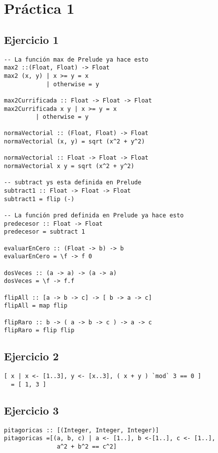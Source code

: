 \section{Práctica 1}
\subsection{Ejercicio 1}
\begin{centrado}
\begin{verbatim}
-- La función max de Prelude ya hace esto
max2 ::(Float, Float) -> Float
max2 (x, y) | x >= y = x        
            | otherwise = y

max2Currificada :: Float -> Float -> Float
max2Currificada x y | x >= y = x
         | otherwise = y

normaVectorial :: (Float, Float) -> Float
normaVectorial (x, y) = sqrt (x^2 + y^2)

normaVectorial :: Float -> Float -> Float
normaVectorial x y = sqrt (x^2 + y^2)

-- subtract ys esta definida en Prelude
subtract1 :: Float -> Float -> Float  
subtract1 = flip (-)

-- La función pred definida en Prelude ya hace esto
predecesor :: Float -> Float  
predecesor = subtract 1

evaluarEnCero :: (Float -> b) -> b
evaluarEnCero = \f -> f 0

dosVeces :: (a -> a) -> (a -> a)
dosVeces = \f -> f.f

flipAll :: [a -> b -> c] -> [ b -> a -> c]
flipAll = map flip

flipRaro :: b -> ( a -> b -> c ) -> a -> c
flipRaro = flip flip
\end{verbatim}
\end{centrado}

\subsection{Ejercicio 2}
\begin{centrado}
\begin{verbatim}
[ x | x <- [1..3], y <- [x..3], ( x + y ) `mod` 3 == 0 ] 
  = [ 1, 3 ]
\end{verbatim}
\end{centrado}

\newpage
\subsection{Ejercicio 3}
\begin{centrado}
\begin{verbatim}
pitagoricas :: [(Integer, Integer, Integer)]
pitagoricas =[(a, b, c) | a <- [1..], b <-[1..], c <- [1..], 
               a^2 + b^2 == c^2]
\end{verbatim}
\end{centrado}

